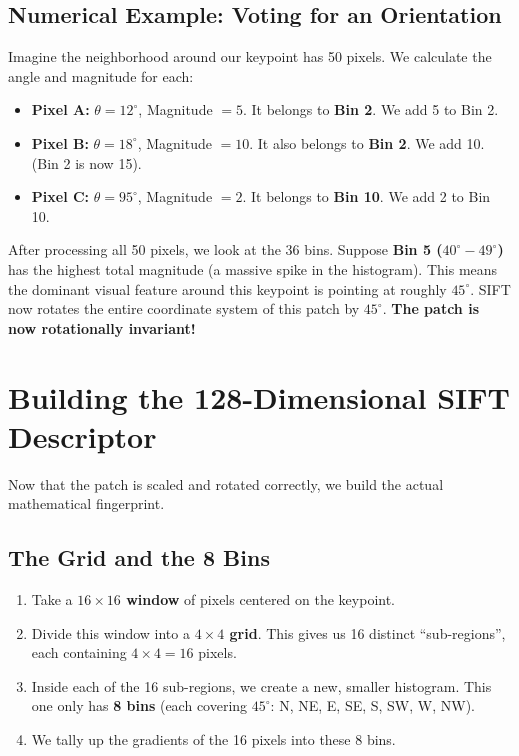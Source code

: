 \documentclass{report}
\begin{document}
\subsection{Numerical Example: Voting for an Orientation}
Imagine the neighborhood around our keypoint has 50 pixels. We calculate the angle and magnitude for each:
\begin{itemize}
    \item \textbf{Pixel A:} $\theta = 12^\circ$, Magnitude $= 5$. It belongs to \textbf{Bin 2}. We add 5 to Bin 2.
    \item \textbf{Pixel B:} $\theta = 18^\circ$, Magnitude $= 10$. It also belongs to \textbf{Bin 2}. We add 10. (Bin 2 is now 15).
    \item \textbf{Pixel C:} $\theta = 95^\circ$, Magnitude $= 2$. It belongs to \textbf{Bin 10}. We add 2 to Bin 10.
\end{itemize}
After processing all 50 pixels, we look at the 36 bins. Suppose \textbf{Bin 5 ($40^\circ - 49^\circ$)} has the highest total magnitude (a massive spike in the histogram).
This means the dominant visual feature around this keypoint is pointing at roughly $45^\circ$. SIFT now rotates the entire coordinate system of this patch by $45^\circ$. \textbf{The patch is now rotationally invariant!}

\section{Building the 128-Dimensional SIFT Descriptor}
Now that the patch is scaled and rotated correctly, we build the actual mathematical fingerprint.

\subsection{The Grid and the 8 Bins}
\begin{enumerate}
    \item Take a \textbf{$16 \times 16$ window} of pixels centered on the keypoint.
    \item Divide this window into a \textbf{$4 \times 4$ grid}. This gives us 16 distinct ``sub-regions'', each containing $4 \times 4 = 16$ pixels.
    \item Inside each of the 16 sub-regions, we create a new, smaller histogram. This one only has \textbf{8 bins} (each covering $45^\circ$: N, NE, E, SE, S, SW, W, NW).
    \item We tally up the gradients of the 16 pixels into these 8 bins.
\end{enumerate}
\end{document}
